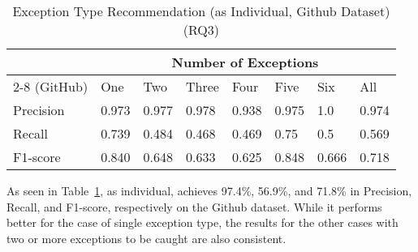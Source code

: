 \begin{table}[t]%
  \caption{Exception Type Recommendation (\xtype as Individual, Github Dataset) (RQ3)}
  \vspace{-12pt}
  \small
	\begin{center}
		\renewcommand{\arraystretch}{1}
		\begin{tabular}{| p{1.2cm}<{\centering} | p{0.6cm}<{\centering} | p{0.6cm}<{\centering}| p{0.6cm}<{\centering} | p{0.6cm}<{\centering} | p{0.6cm}<{\centering} | p{0.6cm}<{\centering} | p{0.6cm}<{\centering} |}
		  \hline
			\multirow{2}{*}{{\xtype}} & \multicolumn{7}{c|}{Number of Exceptions} \\
			\cline{2-8}
			(GitHub) & One & Two & Three & Four & Five & Six & All\\
			\hline
			Precision &  0.973 & 0.977 & 0.978 & 0.938 & 0.975 & 1.0 & 0.974\\
			\hline
			Recall &  0.739 & 0.484 & 0.468 & 0.469 & 0.75 & 0.5 & 0.569\\
			\hline
			F1-score &  0.840 & 0.648 & 0.633 & 0.625 & 0.848 & 0.666 & 0.718\\
			\hline
		\end{tabular}
		\label{tab:xtype-1}
	\end{center}
\end{table}

As seen in Table~\ref{tab:xtype-1}, as individual, {\xtype}
achieves 97.4\%, 56.9\%, and 71.8\% in Precision, Recall, and
F1-score, respectively on the Github dataset. While it performs better
for the case of single exception type, the results for the other cases
with two or more exceptions to be caught are also consistent.
